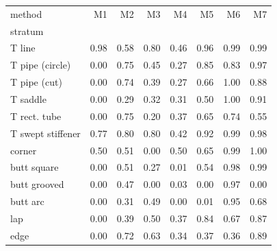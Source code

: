 \begin{tabular}{lrrrrrrr}
\toprule
method & M1 & M2 & M3 & M4 & M5 & M6 & M7 \\
stratum &  &  &  &  &  &  &  \\
\midrule
T line & 0.98 & 0.58 & 0.80 & 0.46 & 0.96 & 0.99 & 0.99 \\
T pipe (circle) & 0.00 & 0.75 & 0.45 & 0.27 & 0.85 & 0.83 & 0.97 \\
T pipe (cut) & 0.00 & 0.74 & 0.39 & 0.27 & 0.66 & 1.00 & 0.88 \\
T saddle & 0.00 & 0.29 & 0.32 & 0.31 & 0.50 & 1.00 & 0.91 \\
T rect. tube & 0.00 & 0.75 & 0.20 & 0.37 & 0.65 & 0.74 & 0.55 \\
T swept stiffener & 0.77 & 0.80 & 0.80 & 0.42 & 0.92 & 0.99 & 0.98 \\
corner & 0.50 & 0.51 & 0.00 & 0.50 & 0.65 & 0.99 & 1.00 \\
butt square & 0.00 & 0.51 & 0.27 & 0.01 & 0.54 & 0.98 & 0.99 \\
butt grooved & 0.00 & 0.47 & 0.00 & 0.03 & 0.00 & 0.97 & 0.00 \\
butt arc & 0.00 & 0.31 & 0.49 & 0.00 & 0.01 & 0.95 & 0.68 \\
lap & 0.00 & 0.39 & 0.50 & 0.37 & 0.84 & 0.67 & 0.87 \\
edge & 0.00 & 0.72 & 0.63 & 0.34 & 0.37 & 0.36 & 0.89 \\
\bottomrule
\end{tabular}

